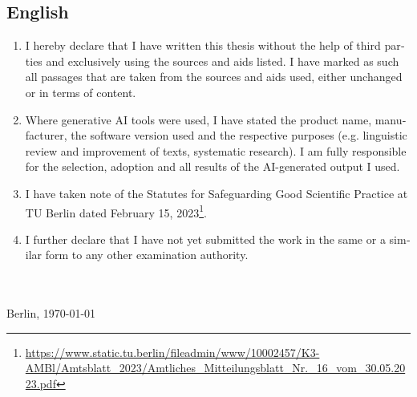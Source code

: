 \begin{otherlanguage}{english}
\section*{English}
\begin{enumerate}[noitemsep]
\item I hereby declare that I have written this thesis without the help of third parties and exclusively using the sources and aids listed. I have marked as such all passages that are taken from the sources and aids used, either unchanged or in terms of content.
\item Where generative AI tools were used, I have stated the product name, manufacturer, the software version used and the respective purposes (e.g. linguistic review and improvement of texts, systematic research). I am fully responsible for the selection, adoption and all results of the AI-generated output I used.
\item I have taken note of the Statutes for Safeguarding Good Scientific Practice at TU Berlin dated February 15, 2023\footnote{\url{https://www.static.tu.berlin/fileadmin/www/10002457/K3-AMBl/Amtsblatt_2023/Amtliches_Mitteilungsblatt_Nr._16_vom_30.05.2023.pdf}}.
\item I further declare that I have not yet submitted the work in the same or a similar form to any other examination authority.
\end{enumerate}
\vspace*{4ex}
\makebox[3in][l]{\hrulefill}\\
\textsc{\autor} \\
Berlin, \today
\end{otherlanguage}
